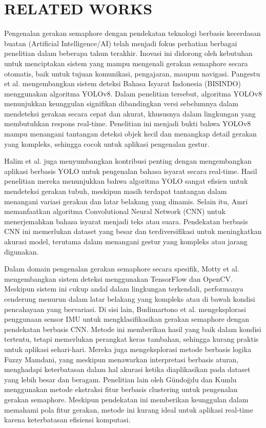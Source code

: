 \documentclass[12pt,a4paper]{article}
\begin{document}

\section{RELATED WORKS}
\begin{adjustwidth}{3em}{0pt} 
\hspace{0.5cm} Pengenalan gerakan semaphore dengan pendekatan teknologi berbasis kecerdasan buatan (Artificial Intelligence/AI) telah menjadi fokus perhatian berbagai penelitian dalam beberapa tahun terakhir. Inovasi ini didorong oleh kebutuhan untuk menciptakan sistem yang mampu mengenali gerakan semaphore secara otomatis, baik untuk tujuan komunikasi, pengajaran, maupun navigasi. Pangestu et al. mengembangkan sistem deteksi Bahasa Isyarat Indonesia (BISINDO) menggunakan algoritma YOLOv8. Dalam penelitian tersebut, algoritma YOLOv8 menunjukkan keunggulan signifikan dibandingkan versi sebelumnya dalam mendeteksi gerakan secara cepat dan akurat, khususnya dalam lingkungan yang membutuhkan respons real-time. Penelitian ini menjadi bukti bahwa YOLOv8 mampu menangani tantangan deteksi objek kecil dan menangkap detail gerakan yang kompleks, sehingga cocok untuk aplikasi pengenalan gestur.

\hspace{0.5cm} Halim et al. juga menyumbangkan kontribusi penting dengan mengembangkan aplikasi berbasis YOLO untuk pengenalan bahasa isyarat secara real-time. Hasil penelitian mereka menunjukkan bahwa algoritma YOLO sangat efisien untuk mendeteksi gerakan tubuh, meskipun masih terdapat tantangan dalam menangani variasi gerakan dan latar belakang yang dinamis. Selain itu, Amri memanfaatkan algoritma Convolutional Neural Network (CNN) untuk menerjemahkan bahasa isyarat menjadi teks atau suara. Pendekatan berbasis CNN ini memerlukan dataset yang besar dan terdiversifikasi untuk meningkatkan akurasi model, terutama dalam menangani gestur yang kompleks atau jarang digunakan.

\hspace{0.5cm} Dalam domain pengenalan gerakan semaphore secara spesifik, Motty et al. mengembangkan sistem deteksi menggunakan TensorFlow dan OpenCV. Meskipun sistem ini cukup andal dalam lingkungan terkendali, performanya cenderung menurun dalam latar belakang yang kompleks atau di bawah kondisi pencahayaan yang bervariasi. Di sisi lain, Budimartono et al. mengeksplorasi penggunaan sensor IMU untuk mengklasifikasikan gerakan semaphore dengan pendekatan berbasis CNN. Metode ini memberikan hasil yang baik dalam kondisi tertentu, tetapi memerlukan perangkat keras tambahan, sehingga kurang praktis untuk aplikasi sehari-hari. Mereka juga mengeksplorasi metode berbasis logika Fuzzy Mamdani, yang meskipun menawarkan interpretasi berbasis aturan, menghadapi keterbatasan dalam hal akurasi ketika diaplikasikan pada dataset yang lebih besar dan beragam. Penelitian lain oleh Gündoğdu dan Kumlu menggunakan metode ekstraksi fitur berbasis clustering untuk pengenalan gerakan semaphore. Meskipun pendekatan ini memberikan keunggulan dalam memahami pola fitur gerakan, metode ini kurang ideal untuk aplikasi real-time karena keterbatasan efisiensi komputasi.


\end{adjustwidth}
\end{document}
